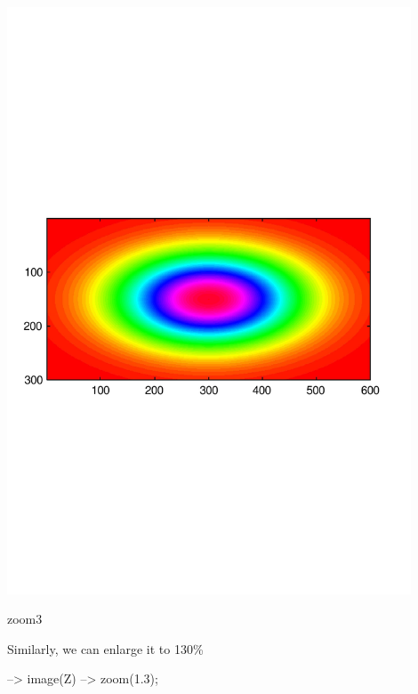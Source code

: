  
\begin{DoxyImage}
\includegraphics[width=12cm]{zoom3}
\caption{zoom3}
\end{DoxyImage}


Similarly, we can enlarge it to 130\%


\begin{DoxyVerbInclude}
--> image(Z)
--> zoom(1.3);
\end{DoxyVerbInclude}


